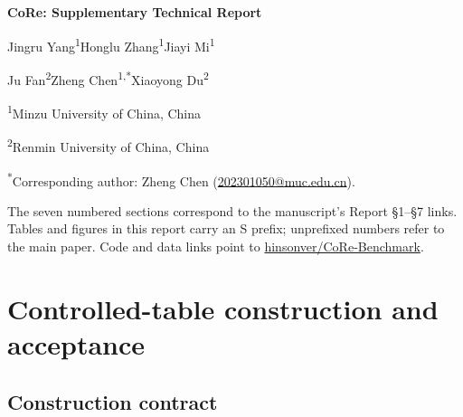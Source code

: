 \documentclass[10pt,a4paper]{article}
\begin{document}
\begin{center}
{\LARGE\bfseries CoRe: Supplementary Technical Report\par}
\vspace{12pt}
{\large Jingru Yang\textsuperscript{1}\quad Honglu Zhang\textsuperscript{1}\quad Jiayi Mi\textsuperscript{1}\par}
\vspace{8pt}
{\large Ju Fan\textsuperscript{2}\quad Zheng Chen\textsuperscript{1,*}\quad Xiaoyong Du\textsuperscript{2}\par}
\vspace{5pt}
\textsuperscript{1}Minzu University of China, China\par
\textsuperscript{2}Renmin University of China, China\par
\vspace{3pt}
{\small\textsuperscript{*}Corresponding author: Zheng Chen (\href{mailto:202301050@muc.edu.cn}{202301050@muc.edu.cn}).\par}
\end{center}
\vspace{6pt}
\begin{abstract}
This report provides the technical specification and extended evidence for CoRe
(\textbf{C}leaning \textbf{o}r \textbf{Re}calling), the evaluation protocol introduced in
\emph{Cleaning or Recalling? Knowledge Dependence in LLM-based Data Cleaning}.
We describe controlled-table construction and acceptance, archived execution and scoring,
Rayyan retrieval and repair-credit criteria, adaptation to other benchmarks, offline
verification routes, extended displays, and sensitivity checks on the existing evidence.
We specify the continuation screen, cell-level metrics and statistical comparisons, distinguishing
construction-seed ranges from fixed-construction intervals and conditional field-check uncertainty.
\end{abstract}
The seven numbered sections correspond to the manuscript's Report \S1--\S7 links.
Tables and figures in this report carry an S prefix; unprefixed numbers refer to the main paper.
Code and data links point to
\href{https://github.com/hinsonver/CoRe-Benchmark/}{hinsonver/CoRe-Benchmark}.
\tableofcontents
\clearpage
\section{Controlled-table construction and acceptance}
\hypertarget{companion-1}{}\label{report-1}

\subsection{Construction contract}
\end{document}
